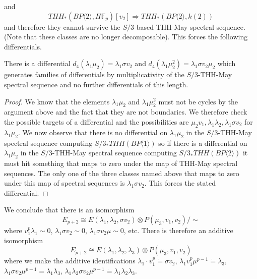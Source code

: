 and 
\[ THH_*(BP\langle 2\rangle , H\mathbb{F}_p)[v_2] \Rightarrow  THH_*(BP\langle 2 \rangle , k(2) )\]
and therefore they cannot survive the $S/3$-based THH-May spectral sequence. (Note that these classes are no longer decomposable). This forces the following differentials. 
\begin{lem}
There is a differential $d_{4}(\lambda_1\mu_2)=\lambda_1\sigma v_2$ and $d_{4}(\lambda_1 \mu_2^2)=\lambda_1\sigma v_2\mu_2$ which generates families of differentials by multiplicativity of the $S/3$-THH-May spectral sequence and no further differentials of this length. 
\end{lem}
\begin{proof}
We know that the elements $\lambda_1\mu_2$ and $\lambda_1 \mu_2^2$ must not be cycles by the argument above and the fact that they are not boundaries. We therefore check the possible targets of a differential and the possibilities are $\mu_2v_1, \lambda_1\lambda_2, \lambda_1\sigma v_2$  for $\lambda_1\mu_2$. We now observe that there is no differential on $\lambda_1\mu_2$ in the $S/3$-THH-May spectral sequence computing $S/3_*THH(BP\langle 1\rangle )$ so if there is a differential on $\lambda_1\mu_2$ in the $S/3$-THH-May spectral sequence computing $S/3_*THH(BP\langle 2\rangle )$ it must hit something that maps to zero under the map of THH-May spectral sequences. The only one of the three classes named above that maps to zero under this map of spectral sequences is $\lambda_1\sigma v_2$. This forces the stated differential. 
\end{proof}
We conclude that there is an isomorphism 
\[E_{p+2} \cong  E(\lambda_1,\lambda_2,\sigma v_2)\otimes P( \mu_3 ,v_1 ,v_2) / \sim \]
where $v_1^p\lambda_1 \sim 0$, $\lambda_1\sigma v_2\sim 0$, $\lambda_1\sigma v_2 \mu \sim 0$, etc. 
There is therefore an additive isomorphism 
\[ E_{p+2}\cong E(\lambda_1, \lambda_2, \lambda_3)\otimes P(\mu_3,v_1, v_2) \]
where we make the additive identifications $\lambda_1\cdot v_1^p\dot{=} \sigma v_2$, $\lambda_1v_1^p\mu^{p-1}\dot{=}\lambda_3$, $\lambda_1\sigma v_2\mu^{p-1}=\lambda_1\lambda_3$, $\lambda_1\lambda_2\sigma v_2\mu^{p-1}\dot{=}\lambda_1\lambda_2\lambda_3$. 

